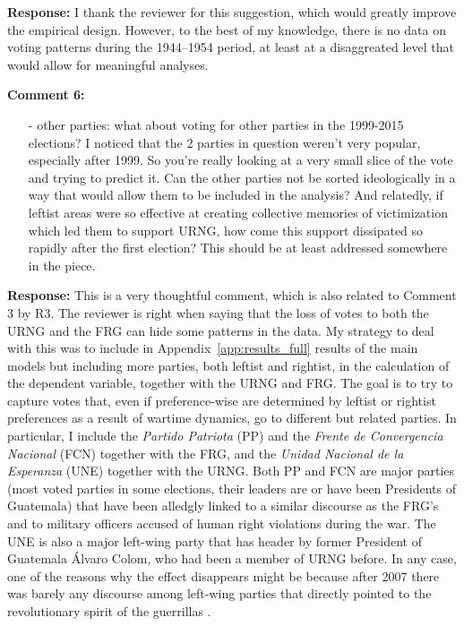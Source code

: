\documentclass[12pt, a4paper, notitlepage]{article}
\begin{document}
\noindent\textbf{Response:} I thank the reviewer for this suggestion, which would greatly improve the empirical design. However, to the best of my knowledge, there is no data on voting patterns during the 1944--1954 period, at least at a disaggreated level that would allow for meaningful analyses.

\vspace{15pt}
\noindent\textbf{Comment 6:}
\begin{displayquote}
\begin{itemize}
\item[-] other parties: what about voting for other parties in the 1999-2015 elections? I noticed that the 2 parties in question weren’t very popular, especially after 1999. So you’re really looking at a very small slice of the vote and trying to predict it. Can the other parties not be sorted ideologically in a way that would allow them to be included in the analysis? And relatedly, if leftist areas were so effective at creating collective memories of victimization which led them to support URNG, how come this support dissipated so rapidly after the first election? This should be at least addressed somewhere in the piece.
\end{itemize}
\end{displayquote}

\noindent\textbf{Response:} This is a very thoughtful comment, which is also related to Comment 3 by R3. The reviewer is right when saying that the loss of votes to both the URNG and the FRG can hide some patterns in the data. My strategy to deal with this was to include in Appendix~\ref{app:results_full} results of the main models but including more parties, both leftist and rightist, in the calculation of the dependent variable, together with the URNG and FRG.
The goal is to try to capture votes that, even if preference-wise are determined by leftist or rightist preferences as a result of wartime dynamics, go to different but related parties.
In particular, I include the \textit{Partido Patriota} (PP) and the \textit{Frente de Convergencia Nacional} (FCN) together with the FRG, and the \textit{Unidad Nacional de la Esperanza} (UNE) together with the URNG.
Both PP and FCN are major parties (most voted parties in some elections, their leaders are or have been Presidents of Guatemala) that have been alledgly linked to a similar discourse as the FRG's and to military officers accused of human right violations during the war.
The UNE is also a major left-wing party that has header by former President of Guatemala Álvaro Colom, who had been a member of URNG before.
In any case, one of the reasons why the effect disappears might be because after 2007 there was barely any discourse among left-wing parties that directly pointed to the revolutionary spirit of the guerrillas \citep{Ibarra:2008to}.
\end{document}

